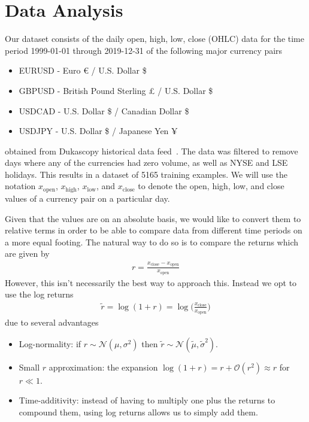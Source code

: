 \section{Data Analysis}
Our dataset consists of the daily open, high, low, close (OHLC) data for the time period 1999-01-01 through 2019-12-31 of the following major currency pairs
\begin{itemize}
    \item EURUSD - Euro € / U.S. Dollar \$
    \item GBPUSD - British Pound Sterling £ / U.S. Dollar \$
    \item USDCAD - U.S. Dollar \$ / Canadian Dollar \$
    \item USDJPY - U.S. Dollar \$ / Japanese Yen ¥
\end{itemize}
obtained from Dukascopy historical data feed~\cite{dukascopy}.
The data was filtered to remove days where any of the currencies had zero volume, as well as NYSE and LSE holidays.
This results in a dataset of 5165 training examples.
We will use the notation \( x_\text{open} \), \( x_\text{high} \), \( x_\text{low} \), and \( x_\text{close} \) to denote the open, high, low, and close values of a currency pair on a particular day.

Given that the values are on an absolute basis, we would like to convert them to relative terms in order to be able to compare data from different time periods on a more equal footing.
The natural way to do so is to compare the returns which are given by
\begin{align}
    r = \frac{x_\text{close} - x_\text{open}}{x_\text{open}}
\end{align}
However, this isn't necessarily the best way to approach this.
Instead we opt to use the log returns
\begin{align}
    \tilde{r}
        = \log(1+r)
        = \log\bigg( \frac{x_\text{close}}{x_\text{open}} \bigg)
\end{align}
due to several advantages~\cite{quantivity_2012}
\begin{itemize}
    \item Log-normality: if \( r \sim \mathcal{N}(\mu, \sigma^2) \) then \( \tilde{r} \sim \mathcal{N}(\tilde{\mu}, \tilde{\sigma}^2) \).
    \item Small \( r \) approximation: the expansion \( \log (1 + r) = r + \mathcal{O}(r^2) \approx r \) for \( r \ll 1 \).
    \item Time-additivity: instead of having to multiply one plus the returns to compound them, using log returns allows us to simply add them.
\end{itemize}

